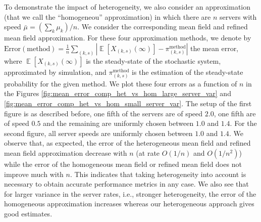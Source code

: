 \documentclass[acmsmall]{acmart}
\DeclareMathOperator{\E}{\mathbb{E}} %
\newcommand\esp[1]{\E\left[#1\right]} %
\newcommand\abs[1]{\left|#1\right|}         %
\begin{document}
To demonstrate the impact of heterogeneity, we also consider an approximation (that we call the ``homogeneou'' approximation) in which there are $n$ servers with speed $\bar{\mu}=(\sum_k\mu_k)/n$. We consider the corresponding mean field and refined mean field approximation. For these four approximation methods, we denote by $\mathrm{Error}(\mathrm{method})=\frac1n \sum_{(k,s)}\abs{\esp{X_{(k,s)}(\infty)} - \pi^{\mathrm{method}}_{(k,s)}}$ the mean error, where $\esp{X_{(k,s)}(\infty)}$ is the steady-state of the stochastic system, approximated by simulation, and $\pi^{\mathrm{method}}_{(k,s)}$ is the estimation of the steady-state probability for the given method. We plot these four errors as a function of $n$ in the Figures \ref{fig:mean_error_comp_het_vs_hom_large_server_var} and \ref{fig:mean_error_comp_het_vs_hom_small_server_var}. The setup of the first figure is as described before, one fifth of the servers are of speed $2.0$, one fifth are of speed $0.5$ and the remaining are uniformly chosen between $1.0$ and $1.4$. For the second figure, all server speeds are uniformly chosen between $1.0$ and $1.4$. 
We observe that, as expected, the error of the heterogeneous mean field and refined mean field approximation decrease with $n$ (at rate $O(1/n)$ and $O(1/n^2)$) while the error of the homogeneous mean field or refined mean field does not improve much with $n$. This indicates that taking heterogeneity into account is necessary to obtain accurate performance metrics in any case. We also see that for larger variance in the server rates, i.e., stronger heterogeneity, the error of the homogeneous approximation increases whereas our heterogeneous approach gives good estimates. 
\end{document}
